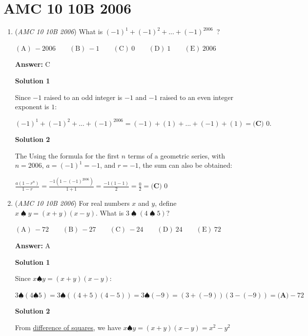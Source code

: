 \section{AMC 10 10B 2006}
        \begin{enumerate}
        	\item (\textit{AMC 10 10B 2006}) What is $(-1)^{1} + (-1)^{2} + ... + (-1)^{2006}$ ?


 $\mathrm{(A) \ } -2006\qquad \mathrm{(B) \ } -1\qquad \mathrm{(C) \ } 0\qquad \mathrm{(D) \ } 1\qquad \mathrm{(E) \ } 2006$

 \textbf{Answer: }C



\textbf{Solution 1}

Since $-1$ raised to an odd integer is $-1$ and $-1$ raised to an even integer exponent is $1$: 

 $(-1)^{1} + (-1)^{2} + ... + (-1)^{2006} = (-1) + (1) + ... + (-1)+(1) = \boxed{\textbf{(C) }0}.$




\textbf{Solution 2}

The Using the formula for the first $n$ terms of a geometric series, with $n = 2006$, $a = (-1)^{1} = -1$, and $r = -1$, the sum can also be obtained:

 $\frac{a(1-r^n)}{1-r} = \frac{-1(1 - (-1)^{2006})}{1 + 1} = \frac{-1(1 - 1)}{2} = \frac{0}{2} = \boxed{\textbf{(C) }0}$



	\item (\textit{AMC 10 10B 2006}) For real numbers $x$ and $y$, define $x \mathop{\spadesuit} y = (x+y)(x-y)$. What is $3 \mathop{\spadesuit} (4 \mathop{\spadesuit} 5)$?


 $\mathrm{(A) \ } -72\qquad \mathrm{(B) \ } -27\qquad \mathrm{(C) \ } -24\qquad \mathrm{(D) \ } 24\qquad \mathrm{(E) \ } 72$

 \textbf{Answer: }A



\textbf{Solution 1}

Since $x \spadesuit y = (x+y)(x-y)$: 

 $3 \spadesuit (4 \spadesuit 5) = 3 \spadesuit((4+5)(4-5)) =  3 \spadesuit (-9) = (3+(-9))(3-(-9)) = \boxed{\textbf{(A)}-72}$




\textbf{Solution 2}

From \href{https://artofproblemsolving.com/wiki/index.php?title=Difference\_of\_squares}{difference of squares}, we have $x \spadesuit y = (x+y)(x-y) = x^2 - y^2$


\end{enumerate}
